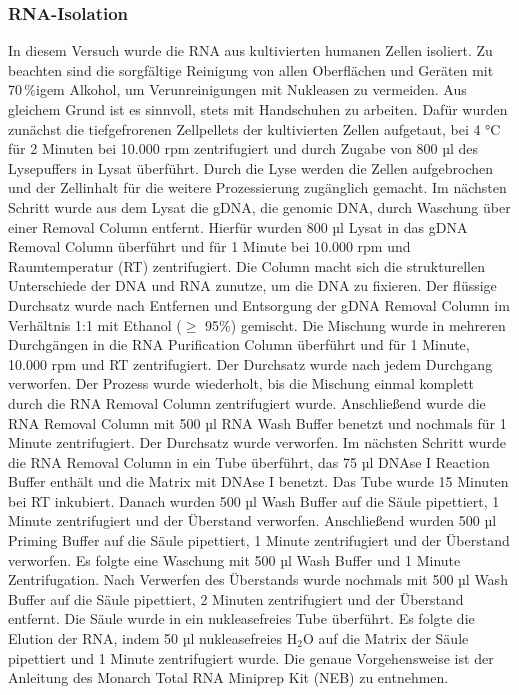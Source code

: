 \documentclass{article}
\begin{document}
\subsubsection*{RNA-Isolation}
In diesem Versuch wurde die RNA aus kultivierten
humanen Zellen isoliert. Zu beachten sind die
sorgfältige Reinigung von allen Oberflächen und Geräten
mit 70\,\%{}igem Alkohol, um Verunreinigungen mit
Nukleasen zu vermeiden. Aus gleichem Grund ist es sinnvoll,
stets mit Handschuhen zu arbeiten.
Dafür wurden zunächst die tiefgefrorenen Zellpellets der
kultivierten Zellen aufgetaut, bei 4 °C für 2 Minuten bei
10.000 rpm zentrifugiert und durch Zugabe von 800 µl des
Lysepuffers in Lysat überführt. 
Durch die Lyse werden die Zellen aufgebrochen
und der Zellinhalt für die weitere Prozessierung zugänglich gemacht.
Im nächsten Schritt wurde aus dem Lysat die gDNA, die genomic DNA,
durch Waschung über einer Removal Column entfernt.
Hierfür wurden 800 µl Lysat in das gDNA Removal Column
überführt und für 1 Minute bei 10.000 rpm und
Raumtemperatur (RT) zentrifugiert.
Die Column macht sich die strukturellen Unterschiede der
DNA und RNA zunutze, um die DNA zu fixieren. Der flüssige
Durchsatz wurde nach Entfernen und Entsorgung der gDNA Removal
Column im Verhältnis 1:1 mit Ethanol (\(\geq\) 95\%) gemischt.
Die Mischung wurde in mehreren Durchgängen in die RNA Purification
Column überführt und für 1 Minute, 10.000 rpm und RT zentrifugiert.
Der Durchsatz wurde nach jedem Durchgang verworfen. Der Prozess
wurde wiederholt, bis die Mischung einmal komplett durch die RNA Removal
Column zentrifugiert wurde. 
Anschließend wurde die RNA Removal Column mit 500 µl RNA Wash Buffer
benetzt und nochmals für 1 Minute zentrifugiert. Der Durchsatz wurde verworfen.
Im nächsten Schritt wurde die RNA Removal Column in ein Tube
überführt, das 75 µl DNAse I Reaction Buffer enthält und die Matrix
mit DNAse I benetzt. 
Das Tube wurde 15 Minuten bei RT inkubiert. Danach wurden 500 µl Wash
Buffer auf die Säule pipettiert, 1 Minute zentrifugiert und der
Überstand verworfen. Anschließend wurden 500 µl Priming Buffer auf die
Säule pipettiert, 1 Minute zentrifugiert und der Überstand verworfen.
Es folgte eine Waschung mit 500 µl Wash Buffer und 1 Minute Zentrifugation.
Nach Verwerfen des Überstands wurde nochmals mit 500 µl Wash Buffer auf die
Säule pipettiert, 2 Minuten zentrifugiert und der Überstand entfernt.
Die Säule wurde in ein nukleasefreies Tube überführt.
Es folgte die Elution der RNA, indem 50 µl nukleasefreies
H$_2$O auf die Matrix der Säule pipettiert und 1 Minute zentrifugiert wurde.
Die genaue Vorgehensweise ist der Anleitung des Monarch
Total RNA Miniprep Kit (NEB) zu entnehmen.
\end{document}
